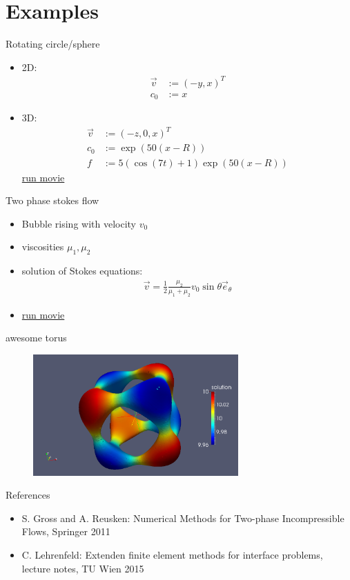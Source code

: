 \documentclass[11pt]{beamer}
\theoremstyle{plain}
\theoremstyle{definition}
\theoremstyle{remark}
\newcommand{\of}[1]{\!\left(#1\right)}
\begin{document}
\section{Examples}
\begin{frame}{Rotating circle/sphere}
	\begin{itemize}
		\item{
		2D:
		\begin{align}
			\vec v&:=\left(-y,x\right)^T\\
			c_0&:=x
		\end{align}
		}
		\pause
		\item{
		3D:
		\begin{align}
			\vec v&:=\left(-z,0,x\right)^T\\
			c_0&:=\exp\of{50\left(x-R\right)}\\
			f&:=5\left(\cos\of{7t}+1\right)\exp\of{50\left(x-R\right)}
		\end{align}
		\href{example_rotatingbubble.ogv}{run movie}
		}
	\end{itemize}
\end{frame}


\begin{frame}{Two phase stokes flow}
	\begin{itemize}[<+->]
	\item{Bubble rising with velocity $v_0$}
	\item{viscosities $\mu_1,\mu_2$}
	\item{
	solution of Stokes equations:
	\begin{align}
		\vec v =\frac{1}{2}\frac{\mu_2}{\mu_1+\mu_2}v_0\sin\theta\vec e_\theta
	\end{align}
	}
	\item{
	\href{example_bubble.ogv}{run movie}
	}
	\end{itemize}
\end{frame}
\begin{frame}{awesome torus}
			\begin{figure}[p]
				\includegraphics[width=0.7\textwidth]{example_newtorus.png}
			\end{figure}
\end{frame}
\begin{frame}{References}
	\begin{itemize}
		\item{S. Gross and A. Reusken: Numerical Methods for Two-phase Incompressible Flows, Springer 2011}
		\item{C. Lehrenfeld: Extenden finite element methods for interface problems, lecture notes, TU Wien 2015}
	\end{itemize}
\end{frame}
\end{document}
